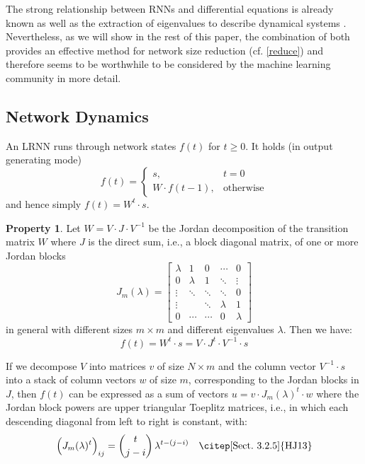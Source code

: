 \documentclass[twoside,11pt]{article}
\theoremstyle{definition}
\newtheorem{prop}{Property}
\begin{document}
The strong relationship between RNNs and differential equations is already known
\citep[Sect.~9]{KB+16} as well as the extraction of eigenvalues to describe
dynamical systems \citep[Sect.~5]{Str15}. Nevertheless, as we will show in the
rest of this paper, the combination of both provides an effective method for
network size reduction (cf. \cref{reduce}) and therefore seems to be worthwhile
to be considered by the machine learning community in more detail.

\subsection{Network Dynamics}\label{dynamics}

An LRNN runs through network states $f(t)$ for $t
\ge 0$. It holds (in output generating mode)
\[ f(t) = \left\{ \begin{array}{ll}
	s, & t=0\\
	W \cdot f(t-1), & \textrm{otherwise}
\end{array} \right. \]
and hence simply $f(t) = W^t \cdot s$.

\begin{prop}\label{jordan}
Let $W = V \cdot J \cdot V^{-1}$ be the Jordan decomposition of the transition
matrix $W$ where $J$ is the direct sum, i.e., a block diagonal matrix, of one or
more Jordan blocks \citep[Sect.~3.1]{HJ13}
\[ J_m(\lambda) = \left[ \begin{array}{*{5}{c}}
  \lambda & 1 & 0 & \cdots & 0\\
  0 & \lambda & 1 & \ddots & \vdots\\
  \vdots & \ddots & \ddots & \ddots & 0\\
  \vdots & & \ddots & \lambda & 1\\
  0 & \cdots & \cdots & 0 & \lambda
\end{array} \right] \]
in general with different sizes $m \times m$ and different eigenvalues $\lambda$.
Then we have: \[ f(t) = W^t \cdot s = V \cdot J^t \cdot V^{-1} \cdot s \]

If we decompose $V$ into matrices $v$ of size $N \times m$ and the column vector
$V^{-1} \cdot s$ into a stack of column vectors $w$ of size $m$, corresponding
to the Jordan blocks in $J$, then $f(t)$ can be expressed as a sum of vectors $u
= v \cdot J_m(\lambda)^t \cdot w$ where the Jordan block powers are upper
triangular Toeplitz matrices, i.e., in which each descending diagonal from left
to right is constant, with:
\begin{equation}\label{power}
  \Big( J_m(\lambda)^t \Big)_{ij} = \binom{t}{j-i}\,\lambda^{t-(j-i)}
	\quad\textrm{\citep[Sect.~3.2.5]{HJ13}}
\end{equation}
\end{prop}
\end{document}

